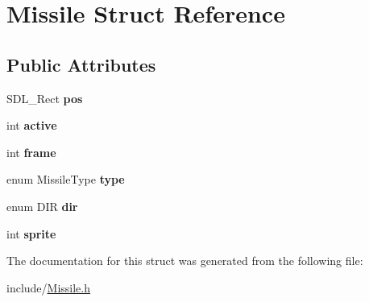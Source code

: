 \hypertarget{structMissile}{}\section{Missile Struct Reference}
\label{structMissile}
\subsection*{Public Attributes}
\begin{DoxyCompactItemize}
\item 
\hypertarget{structMissile_abfe4daa808ccac91567f340c79bbb9d4}{}S\+D\+L\+\_\+\+Rect {\bfseries pos}\label{structMissile_abfe4daa808ccac91567f340c79bbb9d4}

\item 
\hypertarget{structMissile_ad732cff364a3e219851d0763da2884fa}{}int {\bfseries active}\label{structMissile_ad732cff364a3e219851d0763da2884fa}

\item 
\hypertarget{structMissile_a6bdfd2d510a44beeff7a792bb3b54514}{}int {\bfseries frame}\label{structMissile_a6bdfd2d510a44beeff7a792bb3b54514}

\item 
\hypertarget{structMissile_ac7f8b77709a6bcb30adc706d3ffbfa80}{}enum Missile\+Type {\bfseries type}\label{structMissile_ac7f8b77709a6bcb30adc706d3ffbfa80}

\item 
\hypertarget{structMissile_a0bf4f4828196e603db6e3a796d4d36bd}{}enum D\+I\+R {\bfseries dir}\label{structMissile_a0bf4f4828196e603db6e3a796d4d36bd}

\item 
\hypertarget{structMissile_a76a81420d28ab1d5864ff56fef471480}{}int {\bfseries sprite}\label{structMissile_a76a81420d28ab1d5864ff56fef471480}

\end{DoxyCompactItemize}


The documentation for this struct was generated from the following file\+:\begin{DoxyCompactItemize}
\item 
include/\hyperlink{Missile_8h}{Missile.\+h}\end{DoxyCompactItemize}
